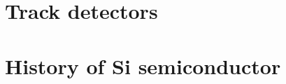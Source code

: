 %
\section{Track detectors}
\label{sec:tracking_detectors}



\section{History of Si semiconductor}
\label{sec:storia_si}

